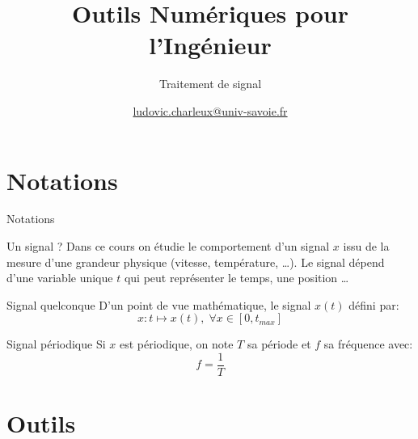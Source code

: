 \documentclass[8pt,a4paper]{beamer}
\author[LC]{\href{mailto:ludovic.charleux@univ-savoie.fr}{ludovic.charleux@univ-savoie.fr}}
\title{Outils Numériques pour l'Ingénieur}
\subtitle{Traitement de signal}
\date{}
\institute{\url{www.polytech.univ-savoie.fr}}
\begin{document}
\begin{frame}[plain]
\titlepage
\tableofcontents
\end{frame}



\section{Notations}
\begin{frame}{Notations}
\begin{block}{Un signal ?}
Dans ce cours on étudie le comportement d'un signal $x$ issu de la mesure d'une grandeur physique (vitesse, température, \ldots). Le signal dépend d'une variable unique $t$ qui peut représenter le temps, une position \ldots 
\end{block}

\begin{block}{Signal quelconque}
D'un point de vue mathématique, le signal $x(t)$ défini par:
$$
x:t \longmapsto x(t), \; \forall x \in [0,t_{max}]
$$

\end{block}

\begin{block}{Signal périodique}
Si $x$ est périodique, on note $T$ sa période et $f$ sa fréquence avec:
$$
f = \frac{1}{T}
$$
\end{block}
\end{frame}

\section{Outils}
\end{document}
